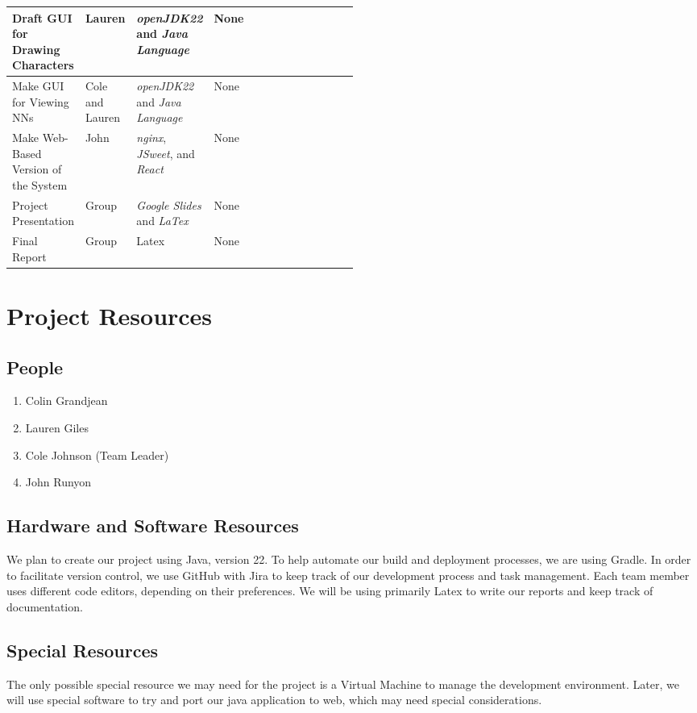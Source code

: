 \documentclass[english,12pt]{article}
\begin{document}
\begin{longtable}{|P{0.20\linewidth}|P{0.10\linewidth}|P{0.2\linewidth}|P{0.5cm}|}
  Draft GUI for Drawing Characters & Lauren & \textit{openJDK22} and \textit{Java Language}  & None\\
  \hline

  Make GUI for Viewing NNs & Cole and Lauren & \textit{openJDK22} and \textit{Java Language}  & None\\
  \hline

  Make Web-Based Version of the System & John & \textit{nginx}, \textit{JSweet}, and \textit{React} & None\\
  \hline

  Project Presentation & Group & \textit{Google Slides} and \textit{LaTex} & None \\
  \hline

  Final Report & Group & Latex & None \\
  \hline
\end{longtable}
\section{Project Resources}

\subsection{People}
\begin{enumerate}
  \item Colin Grandjean 
  \item Lauren Giles   
  \item Cole Johnson (Team Leader)
  \item John Runyon    
\end{enumerate}
\subsection{Hardware and Software Resources}
We plan to create our project using Java, version 22. 
To help automate our build and deployment processes, we are using Gradle. 
In order to facilitate version control, we use GitHub with Jira to keep track of our 
development process and task management. Each team member uses different 
code editors, depending on their preferences. We will be using primarily Latex to
write our reports and keep track of documentation.

\subsection{Special Resources}
The only possible special resource we may need for the project is a Virtual Machine 
to manage the development environment. Later, we will use
special software to try and port our java application to web, which may need
special considerations.
\end{document}
